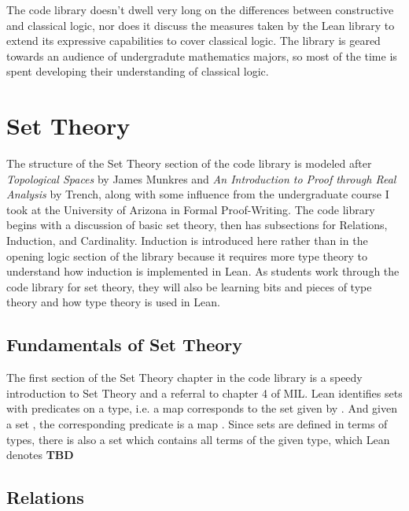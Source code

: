 The code library doesn't dwell very long on the differences between 
constructive and classical logic, nor does it discuss the measures
taken by the Lean library to extend its expressive capabilities to 
cover classical logic. The library is geared towards an audience of 
undergradute mathematics majors, so most of the time is spent developing
their understanding of classical logic.

\section{Set Theory}

The structure of the Set Theory section of the code library is modeled after 
\textit{Topological Spaces} by James Munkres and 
\textit{An Introduction to Proof through Real Analysis} by Trench, along with
some influence from the undergraduate course I took at the University of Arizona
in Formal Proof-Writing. The code library begins with a discussion of basic
set theory, then has subsections for Relations, Induction, and Cardinality. 
Induction is introduced here rather than in the opening logic section of the 
library because it requires more type theory to understand how induction is
implemented in Lean. As students work through the code library for set theory,
they will also be learning bits and pieces of type theory and how type theory
is used in Lean. 

\subsection{Fundamentals of Set Theory}

The first section of the Set Theory chapter in the code library is 
a speedy introduction to Set Theory and a referral to chapter 4 of
MIL. Lean identifies sets with predicates on a type, i.e. a map
 corresponds to the set  given by
. And given a set , the corresponding
predicate is a map . 
Since sets are
defined in terms of types, there is also a set which contains all terms 
of the given type, which Lean denotes 
\textbf{TBD}

\subsection{Relations}

